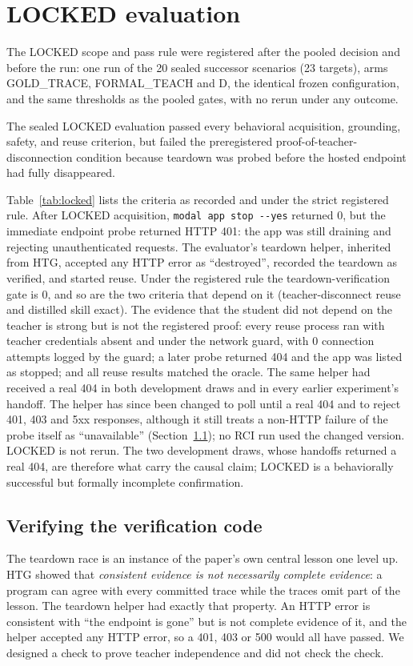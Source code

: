 \documentclass[10pt]{article}
\newcommand{\lockedsentence}{The sealed LOCKED evaluation passed every behavioral acquisition, grounding, safety, and reuse criterion, but failed the preregistered proof-of-teacher-disconnection condition because teardown was probed before the hosted endpoint had fully disappeared.}
\begin{document}
\section{LOCKED evaluation}\label{sec:locked}

The LOCKED scope and pass rule were registered after the pooled decision and before the run: one run of the 20 sealed successor scenarios (23 targets), arms GOLD\_TRACE, FORMAL\_TEACH and D, the identical frozen configuration, and the same thresholds as the pooled gates, with no rerun under any outcome.

\lockedsentence

Table~\ref{tab:locked} lists the criteria as recorded and under the strict registered rule. After LOCKED acquisition, \texttt{modal app stop -{}-yes} returned 0, but the immediate endpoint probe returned HTTP 401: the app was still draining and rejecting unauthenticated requests. The evaluator's teardown helper, inherited from HTG, accepted any HTTP error as ``destroyed'', recorded the teardown as verified, and started reuse. Under the registered rule the teardown-verification gate is 0, and so are the two criteria that depend on it (teacher-disconnect reuse and distilled skill exact). The evidence that the student did not depend on the teacher is strong but is not the registered proof: every reuse process ran with teacher credentials absent and under the network guard, with 0 connection attempts logged by the guard; a later probe returned 404 and the app was listed as stopped; and all reuse results matched the oracle. The same helper had received a real 404 in both development draws and in every earlier experiment's handoff. The helper has since been changed to poll until a real 404 and to reject 401, 403 and 5xx responses, although it still treats a non-HTTP failure of the probe itself as ``unavailable'' (Section~\ref{sec:verifyverify}); no RCI run used the changed version. LOCKED is not rerun. The two development draws, whose handoffs returned a real 404, are therefore what carry the causal claim; LOCKED is a behaviorally successful but formally incomplete confirmation.

\begin{table}[t]
\centering\small
\caption{LOCKED (20 sealed scenarios, 23 targets, Arm D). ``Strict'' applies the registered teardown rule (HTTP 404 required).}
\label{tab:locked}
\resizebox{\linewidth}{!}{}
\end{table}

\subsection{Verifying the verification code}\label{sec:verifyverify}
The teardown race is an instance of the paper's own central lesson one level up. HTG showed that \emph{consistent evidence is not necessarily complete evidence}: a program can agree with every committed trace while the traces omit part of the lesson. The teardown helper had exactly that property. An HTTP error is consistent with ``the endpoint is gone'' but is not complete evidence of it, and the helper accepted any HTTP error, so a 401, 403 or 500 would all have passed. We designed a check to prove teacher independence and did not check the check.
\end{document}
